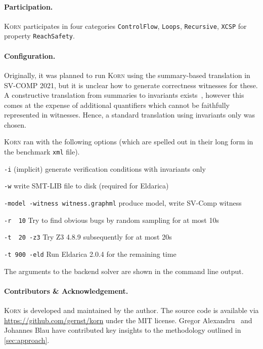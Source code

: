 \documentclass{llncs}
\newcommand{\Korn}{\textsc{Korn}\xspace}
\begin{document}
\paragraph{Participation.} \Korn participates in four categories
\texttt{ControlFlow},
\texttt{Loops},
\texttt{Recursive},
\texttt{XCSP}
for property \texttt{ReachSafety}.

\paragraph{Configuration.}
Originally, it was planned to run \Korn using the summary-based translation in SV-COMP 2021,
but it is unclear how to generate correctness witnesses for these.
A constructive translation from summaries to invariants exists~\cite[Prop. 1]{ernst:arxiv2020:summaries},
however this comes at the expense of additional quantifiers which cannot be faithfully represented in witnesses.
Hence, a standard translation using invariants only was chosen.

\Korn ran with the following options
(which are spelled out in their long form in the benchmark \texttt{xml} file).

\smallskip

\texttt{-i} (implicit)
    \tabto{2.8cm} generate verification conditions with invariants only

\texttt{-w}
    \tabto{2.8cm} write SMT-LIB file to disk (required for Eldarica)

\smallskip

\texttt{-model -witness witness.graphml}
    produce model, write SV-Comp witness

\smallskip

\texttt{-r~~10}
    \tabto{2.8cm} Try to find obvious bugs by random sampling for at most 10s

\texttt{-t~~20 -z3}
    \tabto{2.8cm} Try Z3 4.8.9 subsequently for at most 20s

\texttt{-t~900 -eld}
    \tabto{2.8cm} Run Eldarica 2.0.4 for the remaining time

\smallskip

\noindent
The arguments to the backend solver are shown in the command line output.

\paragraph{Contributors \& Acknowledgement.}

\Korn is developed and maintained by the author.
The source code is available via \url{https://github.com/gernst/korn} under the MIT license.
Gregor Alexandru~\cite{alexandru2019} and Johannes Blau have contributed
key insights to the methodology outlined in \cref{sec:approach}.



\end{document}
